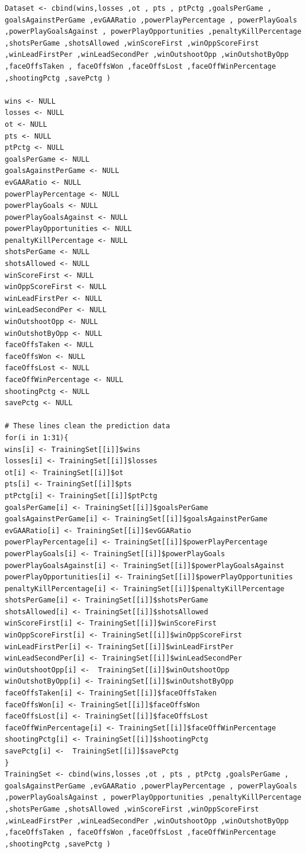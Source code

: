 \begin{verbatim}
Dataset <- cbind(wins,losses ,ot , pts , ptPctg ,goalsPerGame , goalsAgainstPerGame ,evGAARatio ,powerPlayPercentage , powerPlayGoals ,powerPlayGoalsAgainst , powerPlayOpportunities ,penaltyKillPercentage ,shotsPerGame ,shotsAllowed ,winScoreFirst ,winOppScoreFirst ,winLeadFirstPer ,winLeadSecondPer ,winOutshootOpp ,winOutshotByOpp ,faceOffsTaken , faceOffsWon ,faceOffsLost ,faceOffWinPercentage ,shootingPctg ,savePctg )

wins <- NULL
losses <- NULL
ot <- NULL
pts <- NULL
ptPctg <- NULL
goalsPerGame <- NULL
goalsAgainstPerGame <- NULL
evGAARatio <- NULL
powerPlayPercentage <- NULL
powerPlayGoals <- NULL
powerPlayGoalsAgainst <- NULL 
powerPlayOpportunities <- NULL
penaltyKillPercentage <- NULL
shotsPerGame <- NULL
shotsAllowed <- NULL
winScoreFirst <- NULL
winOppScoreFirst <- NULL
winLeadFirstPer <- NULL
winLeadSecondPer <- NULL
winOutshootOpp <- NULL
winOutshotByOpp <- NULL
faceOffsTaken <- NULL
faceOffsWon <- NULL
faceOffsLost <- NULL
faceOffWinPercentage <- NULL
shootingPctg <- NULL
savePctg <- NULL

# These lines clean the prediction data
for(i in 1:31){
wins[i] <- TrainingSet[[i]]$wins
losses[i] <- TrainingSet[[i]]$losses
ot[i] <- TrainingSet[[i]]$ot
pts[i] <- TrainingSet[[i]]$pts
ptPctg[i] <- TrainingSet[[i]]$ptPctg
goalsPerGame[i] <- TrainingSet[[i]]$goalsPerGame
goalsAgainstPerGame[i] <- TrainingSet[[i]]$goalsAgainstPerGame
evGAARatio[i] <- TrainingSet[[i]]$evGGARatio
powerPlayPercentage[i] <- TrainingSet[[i]]$powerPlayPercentage
powerPlayGoals[i] <- TrainingSet[[i]]$powerPlayGoals
powerPlayGoalsAgainst[i] <- TrainingSet[[i]]$powerPlayGoalsAgainst
powerPlayOpportunities[i] <- TrainingSet[[i]]$powerPlayOpportunities
penaltyKillPercentage[i] <- TrainingSet[[i]]$penaltyKillPercentage
shotsPerGame[i] <- TrainingSet[[i]]$shotsPerGame
shotsAllowed[i] <- TrainingSet[[i]]$shotsAllowed
winScoreFirst[i] <- TrainingSet[[i]]$winScoreFirst
winOppScoreFirst[i] <- TrainingSet[[i]]$winOppScoreFirst
winLeadFirstPer[i] <- TrainingSet[[i]]$winLeadFirstPer
winLeadSecondPer[i] <- TrainingSet[[i]]$winLeadSecondPer
winOutshootOpp[i] <-  TrainingSet[[i]]$winOutshootOpp
winOutshotByOpp[i] <- TrainingSet[[i]]$winOutshotByOpp
faceOffsTaken[i] <- TrainingSet[[i]]$faceOffsTaken
faceOffsWon[i] <- TrainingSet[[i]]$faceOffsWon
faceOffsLost[i] <- TrainingSet[[i]]$faceOffsLost
faceOffWinPercentage[i] <- TrainingSet[[i]]$faceOffWinPercentage
shootingPctg[i] <- TrainingSet[[i]]$shootingPctg
savePctg[i] <-  TrainingSet[[i]]$savePctg
}
TrainingSet <- cbind(wins,losses ,ot , pts , ptPctg ,goalsPerGame , goalsAgainstPerGame ,evGAARatio ,powerPlayPercentage , powerPlayGoals ,powerPlayGoalsAgainst , powerPlayOpportunities ,penaltyKillPercentage ,shotsPerGame ,shotsAllowed ,winScoreFirst ,winOppScoreFirst ,winLeadFirstPer ,winLeadSecondPer ,winOutshootOpp ,winOutshotByOpp ,faceOffsTaken , faceOffsWon ,faceOffsLost ,faceOffWinPercentage ,shootingPctg ,savePctg )


\end{verbatim}

